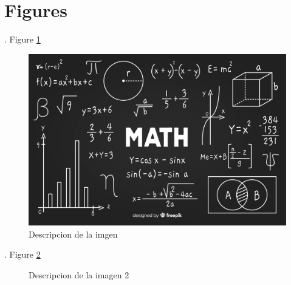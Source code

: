 \documentclass[12pt, letterpaper]{article}
\begin{document}
\section{Figures}
\blindtext. Figure \ref{fig:imagen 1}

\begin{figure}[h]
    \centering
    \includegraphics[width=0.8 \textwidth]{image.jpg}
    \caption{Descripcion de la imgen}
    \label{fig:imagen 1}
\end{figure}

\blindtext. Figure \ref{fig:imagen 2}

\begin{figure}[H]
    \centering
    \hfill

    \caption{Descripcion de la imagen 2}
    \label{fig:imagen 2}
\end{figure}
\end{document}
